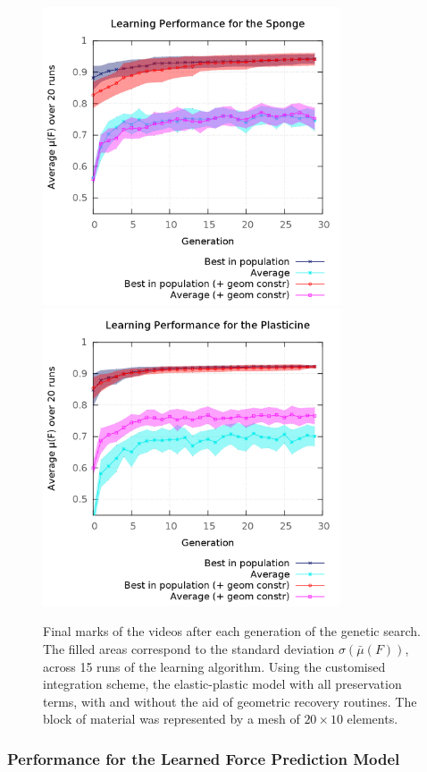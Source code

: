 \documentclass[journal]{IEEEtran}
\newcounter{algorithm}
\newcommand{\comment}[1]{{\color{red} #1}}
\begin{document}
\begin{figure}[!t]
\centering
\includegraphics[width=88mm]{arrio6}
\includegraphics[width=88mm]{arrio7}
\caption{Final marks of the videos after each generation of the genetic search.  The filled areas correspond to the standard deviation $\sigma(\bar{\mu}(F))$, across 15 runs of the learning algorithm.  Using the customised integration scheme, the elastic-plastic model with all preservation terms, with and without the aid of geometric recovery routines.  The block of material was represented by a mesh of $20 \times 10$ elements.}\label{fig:performance}
\end{figure}

\subsubsection{\comment{Performance for the Learned Force Prediction Model}}
\end{document}
